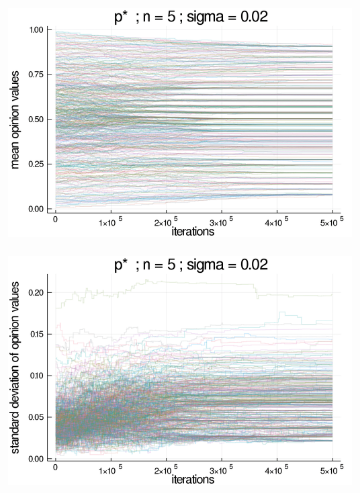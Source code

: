 \documentclass{article}
\begin{document}
{    \begin{figure}[H]
      \centering
      \begin{subfigure}[b]{0.48\textwidth}
        \includegraphics[width=\textwidth]{img/series/tseries5/Poodlcalculatepsn5-rho10e-5-sigma002-00intransrandom.png}
      \end{subfigure}
      \begin{subfigure}[b]{0.48\textwidth}
        \includegraphics[width=\textwidth]{img/series/tseries5/Poodlcalculatepsn5-rho10e-5-sigma002-00intransrandom-std.png}
        \end{subfigure}
      \begin{subfigure}[b]{0.48\textwidth}

\end{subfigure}
\end{figure}}
\end{document}
